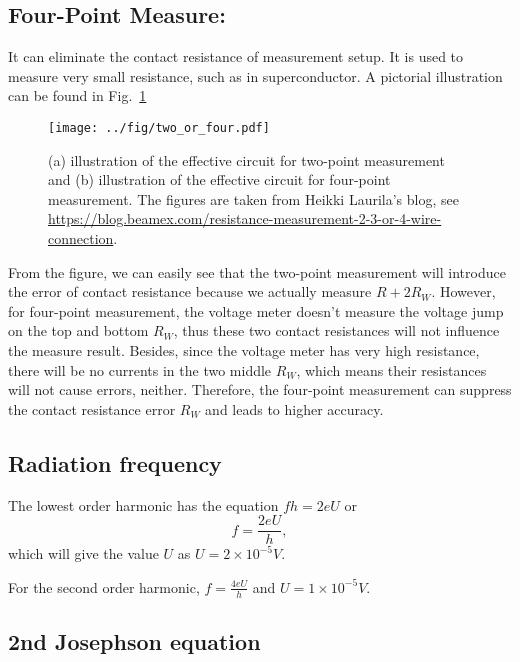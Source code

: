 \subsection{Four-Point Measure:}

It can eliminate the contact resistance of measurement setup. It is
used to measure very small resistance, such as in superconductor.
A pictorial illustration can be found in Fig.\ \ref{two_or_four}

\begin{figure}
\texttt{[image: ../fig/two\_or\_four.pdf]}

\caption{(a) illustration of the effective circuit for two-point measurement
and (b) illustration of the effective circuit for four-point measurement.
The figures are taken from Heikki Laurila's blog, see \protect\href{https://blog.beamex.com/resistance-measurement-2-3-or-4-wire-connection}{https://blog.beamex.com/resistance-measurement-2-3-or-4-wire-connection}. }

\label{two_or_four}
\end{figure}
From the figure, we can easily see that the two-point measurement
will introduce the error of contact resistance because we actually
measure $R+2R_{W}$. However, for four-point measurement, the voltage
meter doesn't measure the voltage jump on the top and bottom $R_{W}$,
thus these two contact resistances will not influence the measure
result. Besides, since the voltage meter has very high resistance,
there will be no currents in the two middle $R_{W}$, which means
their resistances will not cause errors, neither. Therefore, the four-point
measurement can suppress the contact resistance error $R_{W}$ and
leads to higher accuracy. 

\subsection{Radiation frequency}

The lowest order harmonic has the equation $fh=2eU$ or 
\begin{equation}
f=\frac{2eU}{h},
\end{equation}
 which will give the value $U$ as $U=2\times10^{-5}V$.

For the second order harmonic, $f=\frac{4eU}{h}$ and $U=1\times10^{-5}V$.

\subsection{2nd Josephson equation}


